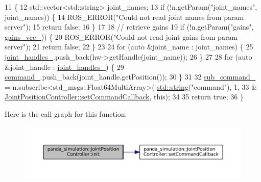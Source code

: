 \begin{DoxyCode}
11                                                                             \{
12     std::vector<std::string> joint\_names;
13     \textcolor{keywordflow}{if} (!n.getParam(\textcolor{stringliteral}{"joint\_names"}, joint\_names)) \{
14       ROS\_ERROR(\textcolor{stringliteral}{"Could not read joint names from param server"});
15       \textcolor{keywordflow}{return} \textcolor{keyword}{false};
16     \}
17 
18     \textcolor{comment}{// retrieve gains}
19     \textcolor{keywordflow}{if} (!n.getParam(\textcolor{stringliteral}{"gains"}, \hyperlink{classpanda__simulation_1_1JointPositionController_ad673fc63239d994614aa233965d391e9}{gains\_vec\_})) \{
20       ROS\_ERROR(\textcolor{stringliteral}{"Could not read joint gains from param server"});
21       \textcolor{keywordflow}{return} \textcolor{keyword}{false};
22     \}
23 
24     \textcolor{keywordflow}{for} (\textcolor{keyword}{auto} &joint\_name : joint\_names) \{
25       \hyperlink{classpanda__simulation_1_1JointPositionController_ada43d341b944aece64c6c6928cbc9060}{joint\_handles\_}.push\_back(hw->getHandle(joint\_name));
26     \}
27 
28     \textcolor{keywordflow}{for} (\textcolor{keyword}{auto} &joint\_handle : \hyperlink{classpanda__simulation_1_1JointPositionController_ada43d341b944aece64c6c6928cbc9060}{joint\_handles\_}) \{
29       \hyperlink{classpanda__simulation_1_1JointPositionController_ab383d39c84291789c8b51c2b4ea08439}{command\_}.push\_back(joint\_handle.getPosition());
30     \}
31 
32     \hyperlink{classpanda__simulation_1_1JointPositionController_a770fa8018c5ee48c3142ee03c44a2941}{sub\_command\_} = n.subscribe<std\_msgs::Float64MultiArray>(
      \hyperlink{namespacetesting_1_1internal_a8e8ff5b11e64078831112677156cb111}{std::string}(\textcolor{stringliteral}{"command"}), 1,
33                                                             &
      \hyperlink{classpanda__simulation_1_1JointPositionController_a047694491f9c2f2f2c241050eb4bc31b}{JointPositionController::setCommandCallback}, \textcolor{keyword}{this});
34 
35     \textcolor{keywordflow}{return} \textcolor{keyword}{true};
36   \}
\end{DoxyCode}
Here is the call graph for this function\+:
\nopagebreak
\begin{figure}[H]
\begin{center}
\leavevmode
\includegraphics[width=350pt]{classpanda__simulation_1_1JointPositionController_a51edb4326fc39dafe64995e0361ba42c_cgraph}
\end{center}
\end{figure}
